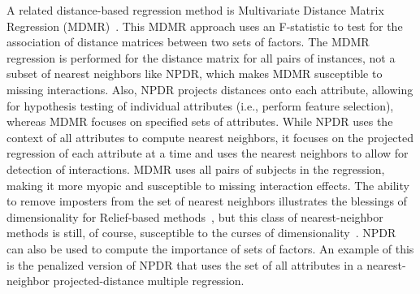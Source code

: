 \documentclass[10pt]{article}
\begin{document}

A related distance-based regression method is Multivariate Distance Matrix Regression (MDMR)~\cite{schork12}.
This MDMR approach uses an F-statistic to test for the association of distance matrices between two sets of factors.
The MDMR regression is performed for the distance matrix for all pairs of instances, not a subset of nearest neighbors like NPDR, which makes MDMR susceptible to missing interactions.
Also, NPDR projects distances onto each attribute, allowing for hypothesis testing of individual attributes (i.e., perform feature selection), whereas MDMR focuses on specified sets of attributes.
While NPDR uses the context of all attributes to compute nearest neighbors, it focuses on the projected regression of each attribute at a time and uses the nearest neighbors to allow for detection of interactions.
MDMR uses all pairs of subjects in the regression, making it more myopic and susceptible to missing interaction effects.
The ability to remove imposters from the set of nearest neighbors illustrates the blessings of dimensionality for Relief-based methods~\cite{bod}, but this class of nearest-neighbor methods is still, of course, susceptible to the curses of dimensionality~\cite{CoD}.
NPDR can also be used to compute the importance of sets of factors.
An example of this is the penalized version of NPDR that uses the set of all attributes in a nearest-neighbor projected-distance multiple regression.
\end{document}
